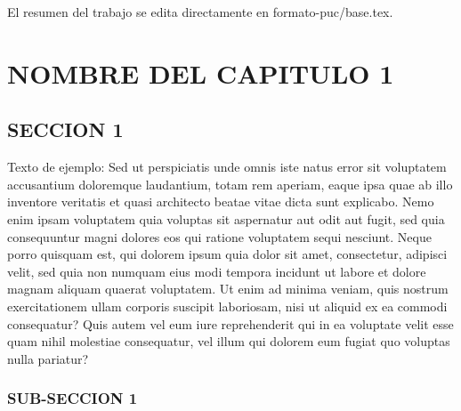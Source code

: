 \documentclass[12pt,reqno,oneside,pdftex]{formato-puc/puctesis} %
\begin{document}
El resumen del trabajo se edita directamente en formato-puc/base.tex.

\cleardoublepage %



\NoChapterPageNumber           %


\chapter{NOMBRE DEL CAPITULO 1}

\hypertarget{seccion-1}{%
\section{SECCION 1}\label{seccion-1}}

Texto de ejemplo: Sed ut perspiciatis unde omnis iste natus error sit
voluptatem accusantium doloremque laudantium, totam rem aperiam, eaque
ipsa quae ab illo inventore veritatis et quasi architecto beatae vitae
dicta sunt explicabo. Nemo enim ipsam voluptatem quia voluptas sit
aspernatur aut odit aut fugit, sed quia consequuntur magni dolores eos
qui ratione voluptatem sequi nesciunt. Neque porro quisquam est, qui
dolorem ipsum quia dolor sit amet, consectetur, adipisci velit, sed quia
non numquam eius modi tempora incidunt ut labore et dolore magnam
aliquam quaerat voluptatem. Ut enim ad minima veniam, quis nostrum
exercitationem ullam corporis suscipit laboriosam, nisi ut aliquid ex ea
commodi consequatur? Quis autem vel eum iure reprehenderit qui in ea
voluptate velit esse quam nihil molestiae consequatur, vel illum qui
dolorem eum fugiat quo voluptas nulla pariatur?

\hypertarget{sub-seccion-1}{%
\subsection{SUB-SECCION 1}\label{sub-seccion-1}}
\end{document}
